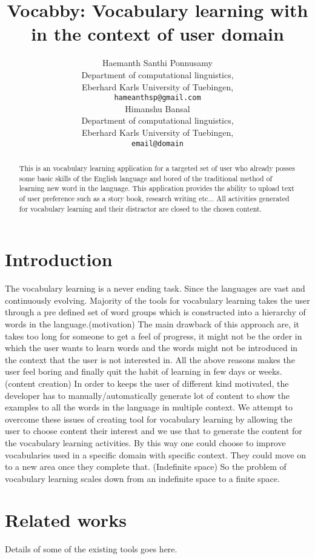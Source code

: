 \documentclass[11pt,a4paper]{article}
\title{Vocabby: Vocabulary learning with in the context of user domain}
\author{Haemanth Santhi Ponnusamy \\
  Department of computational linguistics, \\
  Eberhard Karls University of Tuebingen,\\
  {\tt hameanthsp@gmail.com} \\\And
  Himanshu Bansal \\
  Department of computational linguistics, \\
  Eberhard Karls University of Tuebingen,\\
  {\tt email@domain} \\}
\date{}
\begin{document}
\maketitle
\begin{abstract}
  This is an vocabulary learning application for a targeted set of user
  who already posses some basic skills of the English language and
  bored of the traditional method of learning new word in the language. This
  application provides the ability to upload text of user preference
  such as a story book, research writing etc... All activities generated for
  vocabulary learning and their distractor are closed to the chosen content.
\end{abstract}

\section{Introduction}
The vocabulary learning is a never ending task. Since the languages are vast
and continuously evolving. Majority of the tools for vocabulary learning takes
the user through a pre defined set of word groups which is constructed into a
hierarchy of words in the language.(motivation) The main drawback of this approach are, it
takes too long for someone to get a feel of progress, it might not be the
order in which the user wants to learn words and the words might not be
introduced in the context that the user is not interested in. All the above reasons
makes the user feel boring and finally quit the habit of learning in few days
or weeks. (content creation) In order to keeps the user of different kind
motivated, the developer has to manually/automatically generate lot of content
to show the examples to all the words in the language in multiple context.
We attempt to overcome these issues of creating tool for vocabulary learning
by allowing the user to choose content their interest and we use that to
generate the content for the vocabulary learning activities. By this way one
could choose to improve vocabularies used in a specific domain with specific
context. They could move on to a new area once they complete that.
(Indefinite space) So the problem of vocabulary learning scales down from an
indefinite space to a finite space.

\section{Related works}
Details of some of the existing tools goes here.
\end{document}
